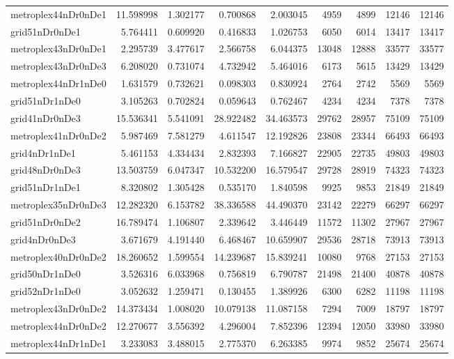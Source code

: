 \begin{longtable}{|l|r|r|r|r|r|r|r|r|}
metroplex44nDr0nDe1 & 11.598998 & 1.302177 & 0.700868 & 2.003045 & 4959 & 4899 & 12146 & 12146 \\
grid51nDr0nDe1 & 5.764411 & 0.609920 & 0.416833 & 1.026753 & 6050 & 6014 & 13417 & 13417 \\
metroplex43nDr0nDe1 & 2.295739 & 3.477617 & 2.566758 & 6.044375 & 13048 & 12888 & 33577 & 33577 \\
metroplex43nDr0nDe3 & 6.208020 & 0.731074 & 4.732942 & 5.464016 & 6173 & 5615 & 13429 & 13429 \\
metroplex44nDr1nDe0 & 1.631579 & 0.732621 & 0.098303 & 0.830924 & 2764 & 2742 & 5569 & 5569 \\
grid51nDr1nDe0 & 3.105263 & 0.702824 & 0.059643 & 0.762467 & 4234 & 4234 & 7378 & 7378 \\
grid41nDr0nDe3 & 15.536341 & 5.541091 & 28.922482 & 34.463573 & 29762 & 28957 & 75109 & 75109 \\
metroplex41nDr0nDe2 & 5.987469 & 7.581279 & 4.611547 & 12.192826 & 23808 & 23344 & 66493 & 66493 \\
grid4nDr1nDe1 & 5.461153 & 4.334434 & 2.832393 & 7.166827 & 22905 & 22735 & 49803 & 49803 \\
grid48nDr0nDe3 & 13.503759 & 6.047347 & 10.532200 & 16.579547 & 29728 & 28919 & 74323 & 74323 \\
grid51nDr1nDe1 & 8.320802 & 1.305428 & 0.535170 & 1.840598 & 9925 & 9853 & 21849 & 21849 \\
metroplex35nDr0nDe3 & 12.282320 & 6.153782 & 38.336588 & 44.490370 & 23142 & 22279 & 66297 & 66297 \\
grid51nDr0nDe2 & 16.789474 & 1.106807 & 2.339642 & 3.446449 & 11572 & 11302 & 27967 & 27967 \\
grid4nDr0nDe3 & 3.671679 & 4.191440 & 6.468467 & 10.659907 & 29536 & 28718 & 73913 & 73913 \\
metroplex40nDr0nDe2 & 18.260652 & 1.599554 & 14.239687 & 15.839241 & 10080 & 9768 & 27153 & 27153 \\
grid50nDr1nDe0 & 3.526316 & 6.033968 & 0.756819 & 6.790787 & 21498 & 21400 & 40878 & 40878 \\
grid52nDr1nDe0 & 3.052632 & 1.259471 & 0.130455 & 1.389926 & 6300 & 6282 & 11198 & 11198 \\
metroplex43nDr0nDe2 & 14.373434 & 1.008020 & 10.079138 & 11.087158 & 7294 & 7009 & 18797 & 18797 \\
metroplex44nDr0nDe2 & 12.270677 & 3.556392 & 4.296004 & 7.852396 & 12394 & 12050 & 33980 & 33980 \\
metroplex44nDr1nDe1 & 3.233083 & 3.488015 & 2.775370 & 6.263385 & 9974 & 9852 & 25674 & 25674 \\

\end{longtable}
